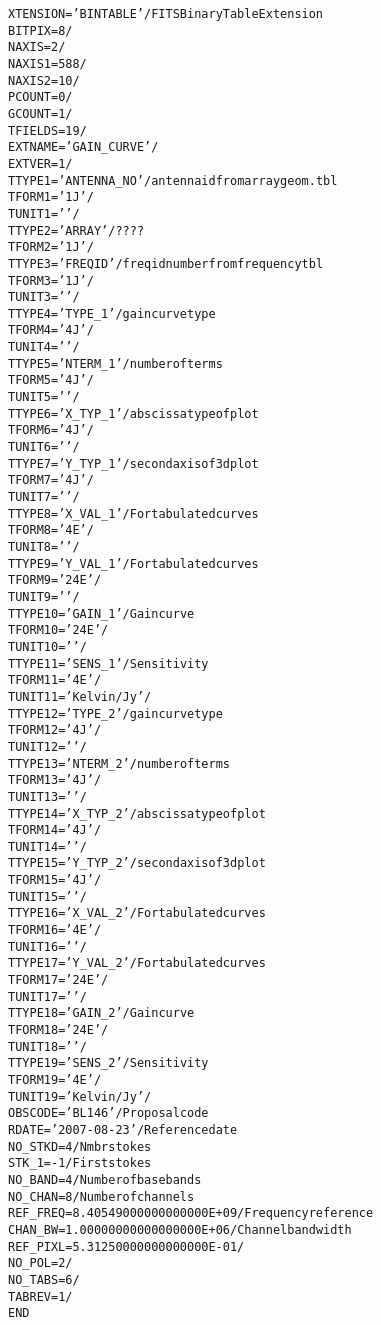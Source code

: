 \documentclass[twoside]{article}
\begin{document}
\begin{alltt}
XTENSION= 'BINTABLE'           / FITS Binary Table Extension
BITPIX  =                    8 /
NAXIS   =                    2 /
NAXIS1  =                  588 /
NAXIS2  =                   10 /
PCOUNT  =                    0 /
GCOUNT  =                    1 /
TFIELDS =                   19 /
EXTNAME = 'GAIN_CURVE'         /
EXTVER  =                    1 /
TTYPE1  = 'ANTENNA_NO'         / antenna id from array geom. tbl
TFORM1  = '1J      '           /
TUNIT1  = '        '           /
TTYPE2  = 'ARRAY   '           / ????
TFORM2  = '1J      '           /
TTYPE3  = 'FREQID  '           / freq id number from frequency tbl
TFORM3  = '1J      '           /
TUNIT3  = '        '           /
TTYPE4  = 'TYPE_1  '           / gain curve type
TFORM4  = '4J      '           /
TUNIT4  = '        '           /
TTYPE5  = 'NTERM_1 '           / number of terms
TFORM5  = '4J      '           /
TUNIT5  = '        '           /
TTYPE6  = 'X_TYP_1 '           / abscissa type of plot
TFORM6  = '4J      '           /
TUNIT6  = '        '           /
TTYPE7  = 'Y_TYP_1 '           / second axis of 3d plot
TFORM7  = '4J      '           /
TUNIT7  = '        '           /
TTYPE8  = 'X_VAL_1 '           / For tabulated curves
TFORM8  = '4E      '           /
TUNIT8  = '        '           /
TTYPE9  = 'Y_VAL_1 '           / For tabulated curves
TFORM9  = '24E     '           /
TUNIT9  = '        '           /
TTYPE10 = 'GAIN_1  '           / Gain curve
TFORM10 = '24E     '           /
TUNIT10 = '        '           /
TTYPE11 = 'SENS_1  '           / Sensitivity
TFORM11 = '4E      '           /
TUNIT11 = 'Kelvin/Jy'          /
TTYPE12 = 'TYPE_2  '           / gain curve type
TFORM12 = '4J      '           /
TUNIT12 = '        '           /
TTYPE13 = 'NTERM_2 '           / number of terms
TFORM13 = '4J      '           /
TUNIT13 = '        '           /
TTYPE14 = 'X_TYP_2 '           / abscissa type of plot
TFORM14 = '4J      '           /
TUNIT14 = '        '           /
TTYPE15 = 'Y_TYP_2 '           / second axis of 3d plot
TFORM15 = '4J      '           /
TUNIT15 = '        '           /
TTYPE16 = 'X_VAL_2 '           / For tabulated curves
TFORM16 = '4E      '           /
TUNIT16 = '        '           /
TTYPE17 = 'Y_VAL_2 '           / For tabulated curves
TFORM17 = '24E     '           /
TUNIT17 = '        '           /
TTYPE18 = 'GAIN_2  '           / Gain curve
TFORM18 = '24E     '           /
TUNIT18 = '        '           /
TTYPE19 = 'SENS_2  '           / Sensitivity
TFORM19 = '4E      '           /
TUNIT19 = 'Kelvin/Jy'          /
OBSCODE = 'BL146   '           / Proposal code
RDATE   = '2007-08-23'         / Reference date
NO_STKD =                    4 / Nmbr stokes
STK_1   =                   -1 / First stokes
NO_BAND =                    4 / Number of basebands
NO_CHAN =                    8 / Number of channels
REF_FREQ=   8.40549000000000000E+09 / Frequency reference
CHAN_BW =   1.00000000000000000E+06 / Channel bandwidth
REF_PIXL=   5.31250000000000000E-01 /
NO_POL  =                    2 /
NO_TABS =                    6 /
TABREV  =                    1 /
END
\end{alltt}
\end{document}
